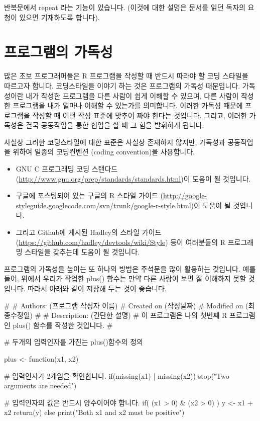 반복문에서 repeat 라는 기능이 있습니다. (이것에 대한 설명은 문서를 읽던 독자의 요청이 있으면 기재하도록 합니다).

\section{프로그램의 가독성}

많은 초보 프로그래머들은 R 프로그램을 작성할 때 반드시 따라야 할 코딩 스타일을 따르고자 합니다.
코딩스타일을 이야기 하는 것은 프로그램의 가독성 때문입니다. 
가독성이란 내가 작성한 프로그램을 다른 사람이 쉽게 이해할 수 있으며, 다른 사람이 작성한 프로그램을 내가 얼마나 이해할 수 있는가를 의미합니다.
이러한 가독성 때문에 프로그램을 작성할 때 어떤 작성 표준에 맞추어 짜야 한다는 것입니다.
그리고, 이러한 가독성은 결국 공동작업을 통한 협업을 할 때 그 힘을 발휘하게 됩니다. 

사실상 그러한 코딩스타일에 대한 표준은 사실상 존재하지 않지만, 가독성과 공동작업을 위하여 일종의 코딩컨벤션 (coding convention)을 사용합니다. 
\begin{itemize}
\item GNU C 프로그래밍 코딩 스탠다드 (\url{http://www.gnu.org/prep/standards/standards.html})이 도움이 될 것입니다. 
\item 구글에 포스팅되어 있는 구글의 R 스타일 가이드 (\url{http://google-styleguide.googlecode.com/svn/trunk/google-r-style.html})이 도움이 될 것입니다. 
\item 그리고 Github에 게시된 Hadley의 스타일 가이드 (\url{https://github.com/hadley/devtools/wiki/Style}) 등이 여러분들의 R 프로그래밍 스타일을 갖추는데 도움이 될 것입니다. 
\end{itemize}

프로그램의 가독성을 높이는 또 하나의 방법은 주석문을 많이 활용하는 것입니다.
예를들어, 위에서 우리가 작업한 plus() 함수는 만약 다른 사람이 보면 잘 이해하지 못할 것입니다. 
따라서 아래와 같이 저장해 두는 것이 좋습니다.

\begin{Schunk}
\begin{Soutput}
# 
# Authors: (프로그램 작성자 이름)
# Created on (작성날짜) 
# Modified on (최종수정일)
# 
# Description: (간단한 설명)
# 이 프로그램은 나의 첫번째 R 프로그램인 plus() 함수를 작성한 것입니다.
# 

# 두개의 입력인자를 가진는 plus()함수의 정의 

plus <- function(x1, x2){

	# 입력인자가 2개임을 확인합니다.
	if(missing(x1) | missing(x2)) stop("Two arguments are needed")
	
	# 입력인자의 값은 반드시 양수이어야 합니다. 
	if( (x1 > 0) & (x2 > 0) ){
		y <- x1 + x2
		return(y)
	}
	else print("Both x1 and x2 must be positive")
}
\end{Soutput}
\end{Schunk}


